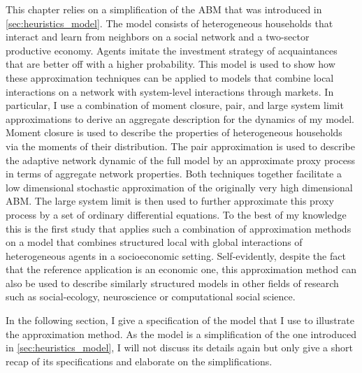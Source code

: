 This chapter relies on a simplification of the ABM that was introduced in \cref{sec:heuristics_model}. The model consists of heterogeneous households that interact and learn from neighbors on a social network and a two-sector productive economy.
Agents imitate the investment strategy of acquaintances that are better off with a higher probability.
This model is used to show how these approximation techniques can be applied to models that combine local interactions on a network with system-level interactions through markets.
In particular, I use a combination of moment closure, pair, and large system limit approximations to derive an aggregate description for the dynamics of my model. Moment closure is used to describe the properties of heterogeneous households via the moments of their distribution. The pair approximation is used to describe the adaptive network dynamic of the full model by an approximate proxy process in terms of aggregate network properties. Both techniques together facilitate a low dimensional stochastic approximation of the originally very high dimensional ABM. The large system limit is then used to further approximate this proxy process by a set of ordinary differential equations.
To the best of my knowledge this is the first study that applies such a combination of approximation methods on a model that combines structured local with global interactions of heterogeneous agents in a socioeconomic setting.
Self-evidently, despite the fact that the reference application is an economic one, this approximation method can also be used to describe similarly structured models in other fields of research such as social-ecology, neuroscience or computational social science.

In the following section, I give a specification of the model that I use to illustrate the approximation method. As the model is a simplification of the one introduced in \cref{sec:heuristics_model}, I will not discuss its details again but only give a short recap of its specifications and elaborate on the simplifications.


